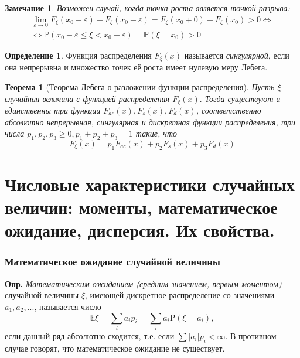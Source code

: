 \documentclass[oneside,final,14pt]{extreport}
\newcommand\mydef{{\bf Опр.}}
\newtheorem{thm}{Теорема}[section]
\newtheorem*{rmrk}{Замечание}
\theoremstyle{definition}
\newtheorem{defn}{Определение}[section]
\begin{document}
\begin{rmrk}
    Возможен случай, когда точка роста является точкой разрыва:
    \begin{multline*}
    \lim _{\varepsilon \to 0} F_{\xi}\left(x_{0}+\varepsilon\right)-F_{\xi}\left(x_{0}-\varepsilon\right)=F_{\xi}\left(x_{0}+0\right)-F_{\xi}\left(x_{0}\right)>0 \Leftrightarrow \\
    \Leftrightarrow \mathbb{P}\left(x_{0}-\varepsilon \leqslant \xi<x_{0}+\varepsilon\right)=\mathbb{P}\left(\xi=x_{0}\right)>0
    \end{multline*}
\end{rmrk}

\begin{defn}
    Функция распределения $F_\xi(x)$ называется {\it сингулярной}, если она непрерывна и множество точек её роста имеет нулевую меру Лебега.
\end{defn}

\begin{thm}[Теорема Лебега о разложении функции распределения]
    Пусть $\xi$~--- случайная величина с функцией распределения $F_\xi(x).$ Тогда существуют и единственны три функции $F_{ac}(x), F_s(x), F_d(x)$, соответственно абсолютно непрерывная, сингулярная и дискретная функции распределения, три числа $p_1, p_2, p_3 \geq 0, p_1 + p_2 + p_3 = 1$ такие, что 
    \begin{equation*}
        F_{\xi}(x)=p_{1} F_{ac}(x)+p_{2} F_{s}(x)+p_{3} F_{d}(x)
    \end{equation*}
\end{thm}

\section{Числовые характеристики случайных величин: моменты, математическое ожидание, дисперсия. Их свойства.}

\subsubsection{Математическое ожидание случайной величины}

\mydef{} {\it Математическим ожиданием (средним значением, первым моментом)} случайной величины $\xi$, имеющей дискретное распределение со значениями $a_1, a_2, ...$, называется число
$$\mathbb{E} \xi=\sum_{i} a_{i} p_{i}=\sum_{i} a_{i} \mathrm{P}\left(\xi=a_{i}\right),$$
если данный ряд абсолютно сходится, т.е. если $\sum |a_i|p_i < \infty.$ В противном случае говорят, что математическое ожидание не существует.
\end{document}
